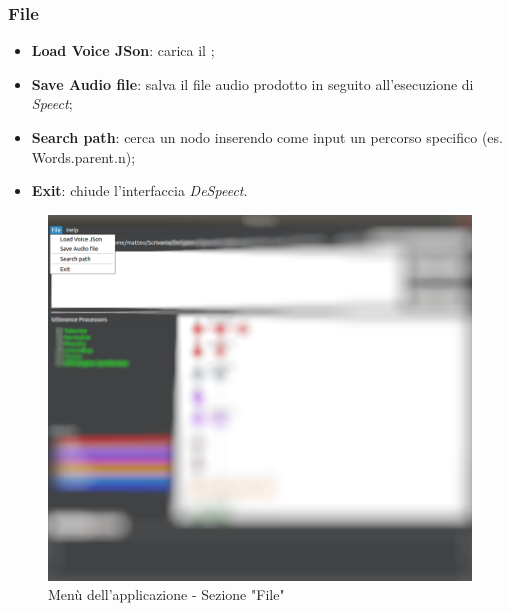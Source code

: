 \documentclass[openany,12pt,a4paper]{report}
\begin{document}
 	\newpage
 	
 	\subsubsection{File} 
 		\begin{itemize}
 			\item \textbf{Load Voice JSon}: carica il  ;
 			\item \textbf{Save Audio file}: salva il file audio prodotto in seguito all'esecuzione di \textit{Speect};
 			\item \textbf{Search path}: cerca un nodo inserendo come input un percorso specifico (es. Words.parent.n);
 			\item \textbf{Exit}: chiude l'interfaccia \textit{DeSpeect}.
 		\end{itemize}
 		
 		\begin{figure}[H]
 			
 			\centering
 			
 			\includegraphics[scale=0.3]{./img/file}
 			
 			\caption{Menù dell'applicazione - Sezione "File"}
 			
 		\end{figure}
 	
 	\newpage
 	
\end{document}
